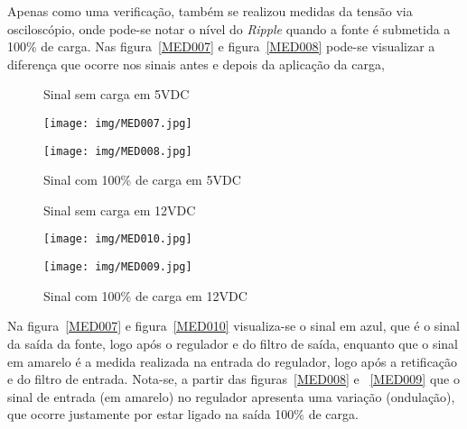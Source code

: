 \documentclass[
	article,			%
	11pt,				%
	oneside,			%
	a4paper,			%
	english,			%
	brazil,				%
	sumario=tradicional
	]{abntex2}
\begin{document}
Apenas como uma verificação, também se realizou medidas da tensão via osciloscópio, onde pode-se notar o nível do \textit{Ripple} quando a fonte é submetida a 100\% de carga. Nas figura~\ref{MED007} e figura~\ref{MED008} pode-se visualizar a diferença que ocorre nos sinais antes e depois da aplicação da carga,
\begin{figure}[htb!]
   \centering
   \begin{minipage}{0.4\textwidth}
   		\centering
   		\caption{Sinal sem carga em 5VDC} \label{MED007}
   		\texttt{[image: img/MED007.jpg]}
   \end{minipage}
   \hspace{1.5cm}
   \begin{minipage}{0.4\textwidth}
   		\centering
   		\caption{Sinal com 100\% de carga em 5VDC} \label{MED008}
   		\texttt{[image: img/MED008.jpg]} 
   \end{minipage}
   \label{fig:FIG_MEDRIPPLE1}
\end{figure}
\begin{figure}[htb!]
   \centering
   \begin{minipage}{0.4\textwidth}
   		\centering
   		\caption{Sinal sem carga em 12VDC} \label{MED010}
   		\texttt{[image: img/MED010.jpg]}
   \end{minipage}
   \hspace{1.5cm}
   \begin{minipage}{0.4\textwidth}
   		\centering
   		\caption{Sinal com 100\% de carga em 12VDC} \label{MED009}
   		\texttt{[image: img/MED009.jpg]} 
   \end{minipage}
   \label{fig:FIG_MEDRIPPLE2}
\end{figure}

Na figura~\ref{MED007} e figura~\ref{MED010} visualiza-se o sinal em azul, que é o sinal da saída da fonte, logo após o regulador e do filtro de saída, enquanto que o sinal em amarelo é a medida realizada na entrada do regulador, logo após a retificação e do filtro de entrada. Nota-se, a partir das figuras~\ref{MED008} e ~\ref{MED009} que o sinal de entrada (em amarelo) no regulador apresenta uma variação (ondulação), que ocorre justamente por estar ligado na saída 100\% de carga. 
\end{document}
